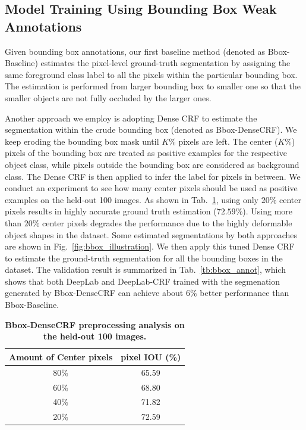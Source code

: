 \subsection{Model Training Using Bounding Box Weak Annotations}
\label{sec:test_bbox}

Given bounding box annotations,
our first baseline method (denoted as Bbox-Baseline) estimates the
pixel-level ground-truth segmentation by assigning the same foreground
class label to all the pixels within the particular bounding box. The
estimation is performed from larger bounding box to smaller one so
that the smaller objects are not fully occluded by the larger
ones. 

Another approach we employ is adopting Dense CRF to estimate the
segmentation within the crude bounding box (denoted as
Bbox-DenseCRF). We keep eroding the bounding box mask until $K\%$
pixels are left. The center ($K\%$) pixels of the bounding box are
treated as positive examples for the respective object class, while
pixels outside the bounding box are considered as background
class. The Dense CRF is then applied to infer the label for pixels in
between. We conduct an experiment to see how many center pixels should
be used as positive examples on the held-out 100 images. As shown in
Tab.~\ref{tb:bbox_erosion}, using only $20\%$ center pixels results in
highly accurate ground truth estimation ($72.59\%$). Using more than
$20\%$ center pixels degrades the performance due to the highly
deformable object shapes in the dataset. Some estimated segmentations
by both approaches are shown in Fig.~\ref{fig:bbox_illustration}. We
then apply this tuned Dense CRF to estimate the ground-truth
segmentation for all the bounding boxes in the dataset. The validation
result is summarized in Tab.~\ref{tb:bbox_annot}, which shows that
both DeepLab and DeepLab-CRF trained with the segmenation generated by
Bbox-DenseCRF can achieve about $6\%$ better performance than
Bbox-Baseline. 

\begin{table}
  \centering
  \caption{{\bf{Bbox-DenseCRF preprocessing analysis on the held-out 100 images.}}}
  \begin{tabular}{c | c}
    Amount of Center pixels & pixel IOU (\%) \\
    \hline
    \hline
    80\%  & 65.59 \\
    60\%  & 68.80 \\
    40\%  & 71.82 \\
    20\%  & 72.59 \\
    \end{tabular}
  \label{tb:bbox_erosion}
\end{table}

